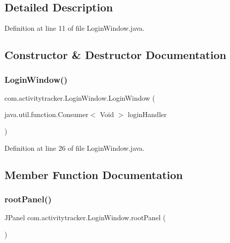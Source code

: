 \subsection{Detailed Description}


Definition at line 11 of file Login\+Window.\+java.



\subsection{Constructor \& Destructor Documentation}
\mbox{\label{classcom_1_1activitytracker_1_1_login_window_a137cce127ffa1660c70d3fddbc0e2a74}} 
\subsubsection{\texorpdfstring{Login\+Window()}{LoginWindow()}}
{\footnotesize\ttfamily com.\+activitytracker.\+Login\+Window.\+Login\+Window (\begin{DoxyParamCaption}\item[{java.\+util.\+function.\+Consumer$<$ Void $>$}]{login\+Handler }\end{DoxyParamCaption})\hspace{0.3cm}{\ttfamily [package]}}



Definition at line 26 of file Login\+Window.\+java.



\subsection{Member Function Documentation}
\mbox{\label{classcom_1_1activitytracker_1_1_login_window_ab1ea45e86bbb79bccd06531279f1e443}} 
\subsubsection{\texorpdfstring{root\+Panel()}{rootPanel()}}
{\footnotesize\ttfamily J\+Panel com.\+activitytracker.\+Login\+Window.\+root\+Panel (\begin{DoxyParamCaption}{ }\end{DoxyParamCaption})\hspace{0.3cm}{\ttfamily [package]}}



